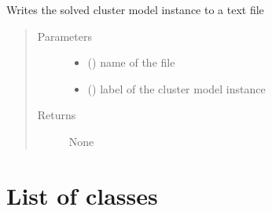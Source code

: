 \documentclass[letterpaper,10pt,english]{sphinxmanual}
\begin{document}
\begin{fulllineitems}
\label{\detokenize{functions:pyqcm.write_cluster_instance_to_file}}
\sphinxAtStartPar
Writes the solved cluster model instance to a text file
\begin{quote}\begin{description}
\item[{Parameters}] \leavevmode\begin{itemize}
\item {} 
\sphinxAtStartPar
{} () \textendash{} name of the file

\item {} 
\sphinxAtStartPar
{} () \textendash{} label of the cluster model instance

\end{itemize}

\item[{Returns}] \leavevmode
\sphinxAtStartPar
None

\end{description}\end{quote}

\end{fulllineitems}



\section{List of classes}
\label{\detokenize{functions:list-of-classes}}

\begin{fulllineitems}
\label{\detokenize{functions:pyqcm.model}}

\begin{fulllineitems}
\label{\detokenize{functions:pyqcm.model.__init__}}
\end{fulllineitems}


\end{fulllineitems}
\end{document}
